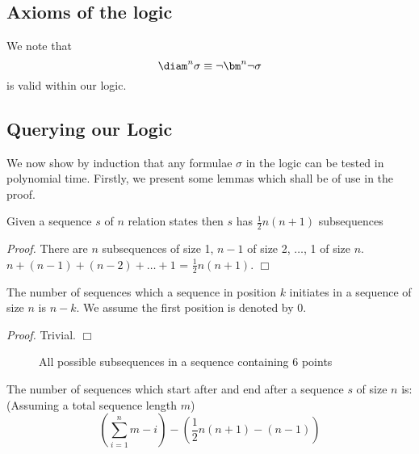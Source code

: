 \subsection{Axioms of the logic}

We note that
\[
\mbox{\diam}^n \sigma \equiv \neg \bm^n \neg \sigma
\]
is valid within our logic.

\subsection{Querying our Logic}


We now show by induction that any formulae $\sigma$ in the logic can be tested
in polynomial time. Firstly, we present some lemmas which shall be of use
in the proof.


\begin{lemma}\label{lemma:subseq}
\begin{rm}
Given a sequence $s$ of $n$ relation states then $s$ has $\frac{1}{2}
n(n+1)$ subsequences
\end{rm}
\end{lemma}

{\em Proof.} There are $n$ subsequences of size 1, $n-1$ of size 2,
$\ldots$, 1 of size $n$. $n + (n-1) + (n-2) + \ldots + 1$ = $\frac{1}{2}
n(n+1)$. $\Box$


\begin{lemma}\label{lemma:seq_initiate}
\begin{rm}
The number of sequences which a sequence in position $k$ initiates in
a sequence of size $n$ is $n-k$. We assume the first position is
denoted by 0.
\end{rm}
\end{lemma}

{\em Proof.} Trivial. $\Box$


\begin{figure}[ht]
\centerline{}
\caption{\label{fig:sequence} All possible subsequences in a sequence
containing 6 points}
\end{figure}


\begin{lemma}\label{lemma:seq_extend}
\begin{rm}
The number of sequences which start after and end after a sequence $s$
of size $n$ is: (Assuming a total sequence length $m$)
\[
(\sum_{i = 1}^{n} m - i) - (\frac{1}{2}n(n+1) - (n-1))
\]
\end{rm}
\end{lemma}

